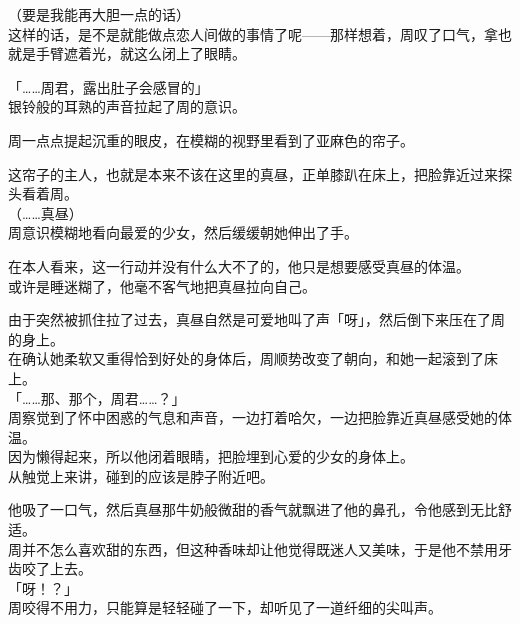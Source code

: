 （要是我能再大胆一点的话）\\

这样的话，是不是就能做点恋人间做的事情了呢——那样想着，周叹了口气，拿也就是手臂遮着光，就这么闭上了眼睛。\\

\vspace{2\baselineskip}

「……周君，露出肚子会感冒的」\\

银铃般的耳熟的声音拉起了周的意识。

周一点点提起沉重的眼皮，在模糊的视野里看到了亚麻色的帘子。

这帘子的主人，也就是本来不该在这里的真昼，正单膝趴在床上，把脸靠近过来探头看着周。\\

（……真昼）\\

周意识模糊地看向最爱的少女，然后缓缓朝她伸出了手。

在本人看来，这一行动并没有什么大不了的，他只是想要感受真昼的体温。\\

或许是睡迷糊了，他毫不客气地把真昼拉向自己。

由于突然被抓住拉了过去，真昼自然是可爱地叫了声「呀」，然后倒下来压在了周的身上。\\

在确认她柔软又重得恰到好处的身体后，周顺势改变了朝向，和她一起滚到了床上。\\

「……那、那个，周君……？」\\

周察觉到了怀中困惑的气息和声音，一边打着哈欠，一边把脸靠近真昼感受她的体温。\\

因为懒得起来，所以他闭着眼睛，把脸埋到心爱的少女的身体上。\\

从触觉上来讲，碰到的应该是脖子附近吧。

他吸了一口气，然后真昼那牛奶般微甜的香气就飘进了他的鼻孔，令他感到无比舒适。\\

周并不怎么喜欢甜的东西，但这种香味却让他觉得既迷人又美味，于是他不禁用牙齿咬了上去。\\

「呀！？」\\

周咬得不用力，只能算是轻轻碰了一下，却听见了一道纤细的尖叫声。

